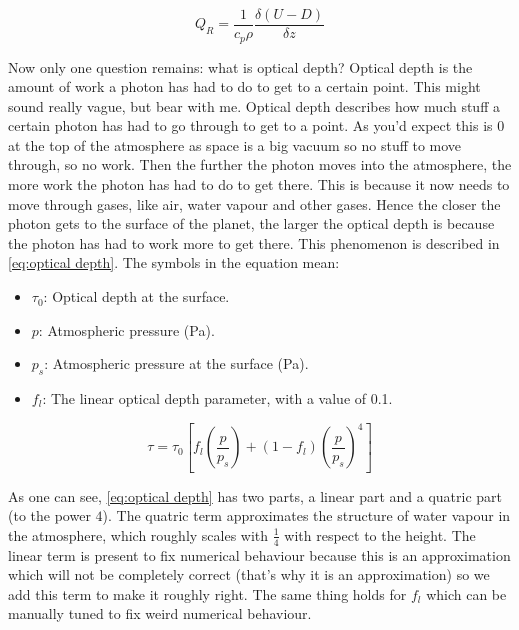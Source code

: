 \begin{equation}
    Q_R = \frac{1}{c_p\rho}\frac{\delta(U - D)}{\delta z}
    \label{eq:heat layer}
\end{equation}

Now only one question remains: what is optical depth? Optical depth is the amount of work a photon has had to do to get to a certain point. This might sound really vague, but bear with me. 
Optical depth describes how much stuff a certain photon has had to go through to get to a point. As you'd expect this is $0$ at the top of the atmosphere as space is a big vacuum so no stuff to 
move through, so no work. Then the further the photon moves into the atmosphere, the more work the photon has had to do to get there. This is because it now needs to move through gases, like air,
water vapour and other gases. Hence the closer the photon gets to the surface of the planet, the larger the optical depth is because the photon has had to work more to get there. This phenomenon
is described in \autoref{eq:optical depth}. The symbols in the equation mean:

\begin{itemize}
    \item $\tau_0$: Optical depth at the surface.
    \item $p$: Atmospheric pressure (\si{Pa}).
    \item $p_s$: Atmospheric pressure at the surface (\si{Pa}).
    \item $f_l$: The linear optical depth parameter, with a value of 0.1.
\end{itemize}

\begin{equation}
    \tau = \tau_0[f_l(\frac{p}{p_s}) + (1 - f_l)(\frac{p}{p_s})^4]
    \label{eq:optical depth}
\end{equation}

As one can see, \autoref{eq:optical depth} has two parts, a linear part and a quatric part (to the power $4$). The quatric term approximates the structure of water vapour in the atmosphere, which 
roughly scales with $\frac{1}{4}$ with respect to the height. The linear term is present to fix numerical behaviour because this is an approximation which will not be completely correct (that's
why it is an approximation) so we add this term to make it roughly right. The same thing holds for $f_l$ which can be manually tuned to fix weird numerical behaviour.

